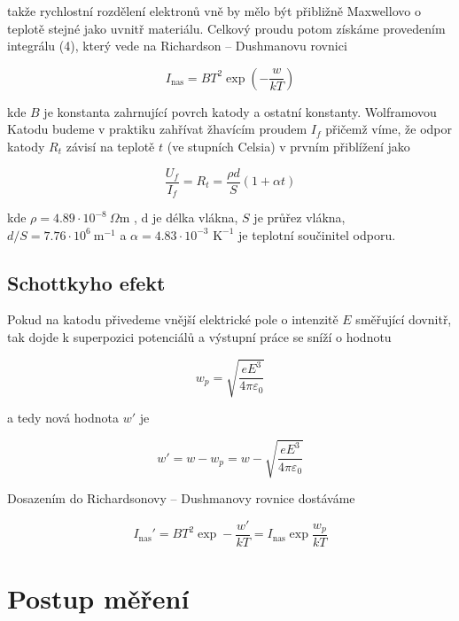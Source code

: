 \documentclass[a4paper,11pt]{article}
\begin{document}
\noindent
takže rychlostní rozdělení elektronů vně by mělo být přibližně Maxwellovo o teplotě stejné jako uvnitř materiálu. Celkový proudu potom získáme provedením integrálu (4), který vede na Richardson – Dushmanovu rovnici

\begin{equation}
I_{\text{nas}} = B T^2 \exp\left(- \frac{w}{kT} \right)
\end{equation}

\noindent
kde $ B $ je konstanta zahrnující povrch katody a ostatní konstanty. Wolframovou Katodu budeme v praktiku zahřívat žhavícím proudem $ I_{f} $ přičemž víme, že odpor katody $ R_t $ závisí na teplotě $ t $ (ve stupních Celsia) v prvním přiblížení jako

\begin{equation}
\frac{U_f}{I_f} = R_t = \frac{\rho d}{ S} (1 + \alpha t)
\end{equation}

\noindent
kde $ \rho = 4.89 \cdot 10^{-8} \ \Omega  $m , d je délka vlákna, $ S $ je průřez vlákna, $ d / S = 7.76 \cdot 10^{6} \ \text{m}^{-1} $ a $ \alpha = 4.83 \cdot 10 ^{-3} \text{ K}^{-1} $ je teplotní součinitel odporu.

\subsection{Schottkyho efekt}

Pokud na katodu přivedeme vnější elektrické pole o intenzitě $ E $ směřující dovnitř, tak dojde k superpozici potenciálů a výstupní práce se sníží o hodnotu

\begin{equation}
 w_p = \sqrt{ \frac{e E^{3}}{4 \pi \varepsilon_0}}
\end{equation}

\noindent
a tedy nová hodnota $w'$ je

\begin{equation}
w' = w - w_p = w - \sqrt{ \frac{e E^{3}}{4 \pi \varepsilon_0}}
\end{equation}

\noindent
Dosazením do Richardsonovy – Dushmanovy rovnice dostáváme

\begin{equation}
    I_{\text{nas}}' = BT^2 \exp - \frac{w'}{kT}  = I_{\text{nas}} \exp \frac{w_p}{kT}
\end{equation}

 
\section{Postup měření}
\end{document}
